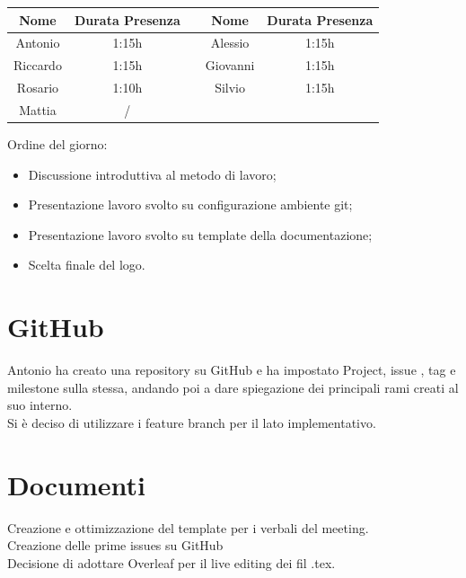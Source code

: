 \documentclass[12pt,a4paper]{article}
\begin{document}
\begin{center}
    \begin{tabular}{ |c|c|c|c|c| }
        \hline
        Nome     & Durata Presenza &  & Nome     & Durata Presenza \\
        \hline
        Antonio  & 1:15h           &  & Alessio  & 1:15h           \\
        \hline
        Riccardo & 1:15h           &  & Giovanni & 1:15h           \\
        \hline
        Rosario  & 1:10h           &  & Silvio   & 1:15h           \\
        \hline
        Mattia   & /           &  &          &                 \\
        \hline

    \end{tabular}
\end{center}

\newpage
Ordine del giorno:

\begin{itemize}
    \item Discussione introduttiva al metodo di lavoro;    
    \item Presentazione lavoro svolto su configurazione ambiente git;
    \item Presentazione lavoro svolto su template della documentazione;
    \item Scelta finale del logo.

\end{itemize}

\section{GitHub}
Antonio ha creato una repository su GitHub e ha impostato Project, issue , tag e milestone sulla stessa, andando poi a dare spiegazione dei principali rami creati al suo interno. \\
Si è deciso di utilizzare i feature branch per il lato implementativo.\\

\section{Documenti}
Creazione e ottimizzazione del template per i verbali del meeting. \\
Creazione delle prime issues su GitHub\\
Decisione di adottare Overleaf per il live editing dei fil .tex.
\end{document}
